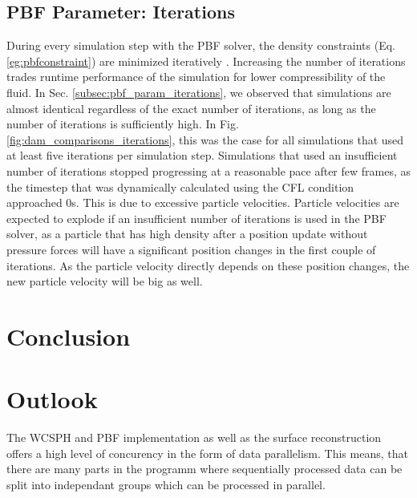 \documentclass[11pt, letterpaper, twocolumn]{article}
\begin{document}
\subsection{PBF Parameter: Iterations}
During every simulation step with the PBF solver, the density constraints (Eq. \ref{eg:pbfconstraint}) are minimized iteratively \cite{macklin2013}. Increasing the number of iterations trades runtime performance of the simulation for lower compressibility of the fluid. In Sec. \ref{subsec:pbf_param_iterations}, we observed
that simulations are almost identical regardless of the exact number of iterations, as long as the number of iterations is sufficiently high. In Fig. \ref{fig:dam_comparisons_iterations}, this was the case for all simulations that used at least five iterations per simulation step. Simulations that used
an insufficient number of iterations stopped progressing at a reasonable pace after few frames, as the timestep that was dynamically calculated using the CFL condition approached 0s. This is due to excessive particle velocities. Particle velocities are expected to explode if an insufficient number of iterations
is used in the PBF solver, as a particle that has high density after a position update without pressure forces will have a significant position changes in the first couple of iterations. As the particle velocity directly depends on these position changes, the new particle velocity will be big as well.  

\section{Conclusion}
\label{sec:conclusion}



\section{Outlook}
\label{sec:future}
The WCSPH and PBF implementation as well as the surface reconstruction offers a high level of concurency in the form of data parallelism. This means, that there are many parts in the programm where sequentially processed data can be split into independant groups which can be processed in parallel.

\end{document}
